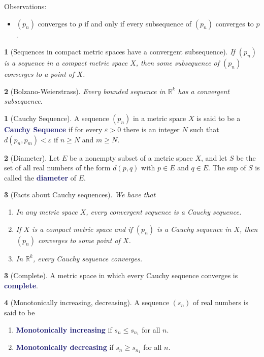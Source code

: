 \documentclass[12pt]{article}
\numberwithin{equation}{section}
\newcommand{\navy}[1]{\textcolor{MidnightBlue}{\bf #1}}
\theoremstyle{plain}
\newtheorem{theorem}{\color{ForestGreen}{\textbf{Theorem}}}[section]
\theoremstyle{definition}
\newtheorem{definition}{\color{MidnightBlue}{\textbf{Definition}}}[section]
\newcommand{\1}{\mathbbm 1}
\newcommand{\e}{\varepsilon}
\newcommand{\RR}{\mathbb R}
\begin{document}
Observations:
\begin{itemize}
	\item $(p_n)$ converges to $p$ if and only if every subsequence of $(p_n)$ converges to $p$. 
\end{itemize}

\begin{theorem}[Sequences in compact metric spaces have a convergent subsequence]
	If $(p_n)$ is a sequence in a compact metric space $X$, then some subsequence of $(p_n)$ converges to a point of $X$.
\end{theorem}

\begin{theorem}[Bolzano-Weierstrass]
	Every bounded sequence in $\RR^k$ has a convergent subsequence.
\end{theorem}

\begin{definition}[Cauchy Sequence]
	A sequence $(p_n)$ in a metric space $X$ is said to be a \navy{Cauchy Sequence} if for every $\e > 0$ there is an integer $N$ such that $d(p_n, p_m) < \e$ if $n \geq N$ and $m \geq N$.
\end{definition}

\begin{definition}[Diameter]
	Let $E$ be a nonempty subset of a metric space $X$, and let $S$ be the set of all real numbers of the form $d(p,q)$ with $p \in E$ and $q \in E$. The sup of $S$ is called the \navy{diameter} of $E$.
\end{definition}

\begin{theorem}[Facts about Cauchy sequences]
	We have that
\begin{enumerate}
	\item In any metric space $X$, every convergent sequence is a Cauchy sequence.
	\item If $X$ is a compact metric space and if $(p_n)$ is a Cauchy sequence in $X$, then $(p_n)$ converges to some point of $X$.
	\item In $\RR^k$, every Cauchy sequence converges. 
\end{enumerate}
\end{theorem}

\begin{definition}[Complete]
	A metric space in which every Cauchy sequence converges is \navy{complete}.
\end{definition}

\begin{definition}[Monotonically increasing, decreasing]
	A sequence $(s_n)$ of real numbers is said to be
	\begin{enumerate}
		\item \navy{Monotonically increasing} if $s_n \leq s_{n_1}$ for all $n$.
		\item \navy{Monotonically decreasing} if $s_n \geq s_{n_1}$ for all $n$.
	\end{enumerate}
\end{definition}
\end{document}
